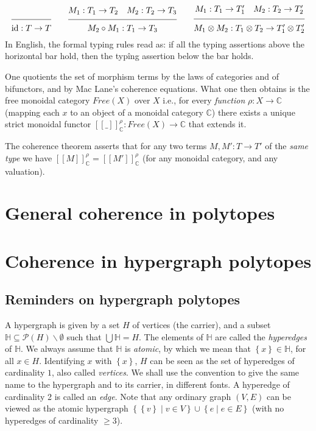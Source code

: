 \documentclass[10pt]{amsart}
\theoremstyle{definition}
\theoremstyle{remark}
\numberwithin{equation}{section}
\newcommand{\set}[1]{\left\{#1\right\}}
\newcommand{\id}{\mathrm{id}}
\newcommand{\0}{\color{blue}{\mathsf{0}}}
\newcommand{\inc}{\subseteq}
\newcommand{\union}{\cup}
\newcommand{\Union}{\bigcup}
\newcommand{\comp}{\circ}
\newcommand{\setc}[2]{\set{#1 \mid #2}}
\newcommand \seq[2]{\shortstack{$#1$ \\ \mbox{}\\
                    \mbox{}\hrulefill\mbox{}\\ \mbox{}\\ $#2$}}
\newcommand{\cat}[1]{{\mathbb #1}}
\newcommand{\dl}{[\![}
\newcommand{\dr}{]\!]}
\newcommand{\hyper}[1]{{\mathbb #1}}
\begin{document}
$$\seq{}{\id:T\rightarrow T}\quad\quad \seq{M_1:T_1\rightarrow T_2\quad M_2:T_2\rightarrow T_3}{M_2\comp M_1:T_1\rightarrow T_3}\quad\quad \seq{M_1:T_1\rightarrow T'_1\quad M_2:T_2\rightarrow T'_2}{M_1\otimes M_2:T_1\otimes T_2\rightarrow T'_1\otimes T'_2}$$
In English, the formal typing rules read as: if all the typing assertions above the horizontal bar hold, then the typîng assertion below the bar holds.

One quotients the set of morphism terms by the laws of categories and of bifunctors, and by Mac Lane's coherence equations.
What one then obtains is the free monoidal category ${Free}(X)$ over $X$ i.e., for every {\em function} $\rho:X\rightarrow \cat{C}$ (mapping each $x$ to an object of  a monoidal category $\cat{C}$) there exists a unique strict monoidal functor $\dl \_\dr^\rho_{\cat{C}}:{Free}(X)\rightarrow\cat{C}$ that extends it.

The coherence theorem asserts that for any two terms $M,M':T\rightarrow T'$  of the {\em same type} we have $\dl M\dr^\rho_{\cat{C}}=\dl M'\dr^\rho_{\cat{C}}$  (for any monoidal category, and any valuation).


\section*{General coherence in polytopes}

\section*{Coherence in hypergraph polytopes}

\subsection*{Reminders on hypergraph polytopes}

A hypergraph is given by a set  $H$ of vertices (the carrier), and a subset 
$\hyper{H}\inc {\mathcal{P}}(H)\backslash\emptyset$ such that $\Union \hyper{H}=H$.
 The elements of $\hyper{H}$ are called the {\em hyperedges} of $\hyper{H}$.  
 We always assume that $\hyper{H}$ is {\em atomic}, by which we mean that 
 $\set{x}\in \hyper{H}$, for all $x\in H$. 
 Identifying $x$ with $\set{x}$, $H$ can be seen as the set of  hyperedges of 
 cardinality $1$, also called {\em vertices}. We shall use the convention to 
 give the same name to the hypergraph and to its carrier, in different fonts. 
A hyperedge of cardinality 2 is called an {\em edge}.  Note that any ordinary graph $(V,E)$ can be viewed as the atomic hypergraph
$\setc{\set{v}}{v\in V} \union \setc{e}{e\in E}$ (with no hyperedges of cardinality $\geq 3$). 
\end{document}
